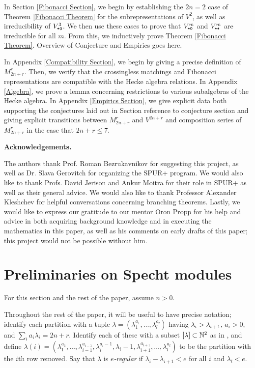 \documentclass{amsart}
\newcommand{\fakesubsection}[1]{
    \vspace{7pt}
    \noindent \textbf{#1.}
  }
\begin{document}
  \vspace{5pt}
  In Section \ref{Fibonacci Section}, we begin by establishing the $2n = 2$ case of Theorem \ref{Fibonacci Theorem} for the subrepresentations of $V^2$, as well as irreducibility of $V^3_{\texttt{*}\texttt{0}}$.
  We then use these cases to prove that $V^m_{\texttt{*}\texttt{0}}$ and $V^m_{\texttt{*}\texttt{*}}$ are irreducible for all $m$.
  From this, we inductively prove Theorem \ref{Fibonacci Theorem}.
  {\color{orange} Overview of Conjecture and Empirics goes here.}

  \vspace{5pt}
  In Appendix \ref{Compatibility Section}, we begin by giving a precise definition of $M_{2n + r}^r$.
  Then, we verify that the crossingless matchings and Fibonacci representations are compatible with the Hecke algebra relations.
  In Appendix \ref{Algebra}, we prove a lemma concerning restrictions to various subalgebras of the Hecke algebra.
  In Appendix \ref{Empirics Section}, we give explicit data both supporting the conjectures laid out in Section {\color{orange} reference to conjecture section} and giving explicit transitions between $M_{2n + r}^r$ and $V^{2n + r}$ and composition series of $M_{2n + r}^r$ in the case that $2n + r \leq 7$.

  \fakesubsection{Acknowledgements}
  The authors thank Prof. Roman Bezrukavnikov for suggesting this project, as well as Dr. Slava Gerovitch for organizing the SPUR+ program.
  We would also like to thank Profs. David Jerison and Ankur Moitra for their role in SPUR+ as well as their general advice.
  We would also like to thank Professor Alexander Kleshchev for helpful conversations concerning branching theorems.
  Lastly, we would like to express our gratitude to our mentor Oron Propp for his help and advice in both acquiring background knowledge and in executing the mathematics in this paper, as well as his comments on early drafts of this paper;
  this project would not be possible without him.
   
\section{Preliminaries on Specht modules}\label{Specht Modules Section}
  For this section and the rest of the paper, assume $n > 0$.
  
  Throughout the rest of the paper, it will be useful to have precise notation;
  identify each partition with a tuple $\lambda = (\lambda_1^{a_1},\dots,\lambda_l^{a_l})$ having $\lambda_i > \lambda_{i+1}$, $a_i > 0$, and $\sum_i a_i\lambda_i = 2n + r$.
  Identify each of these with a subset $\left[ \lambda \right] \subset \mathbb{N}^2$ as in \cite{Kleshchev}, and define $\lambda(i) = (\lambda_1^{a_1},\dots,\lambda_{i-1}^{a_{i-1}},\lambda_i^{a_i - 1},\lambda_i-1,\lambda_{i+1}^{a_{i+1}},\dots,\lambda_l^{a_l})$ to be the partition with the $i$th row removed.
  Say that $\lambda$ is \emph{$e$-regular} if $\lambda_i - \lambda_{i+1} < e$ for all $i$ and $\lambda_l < e$.
\end{document}

